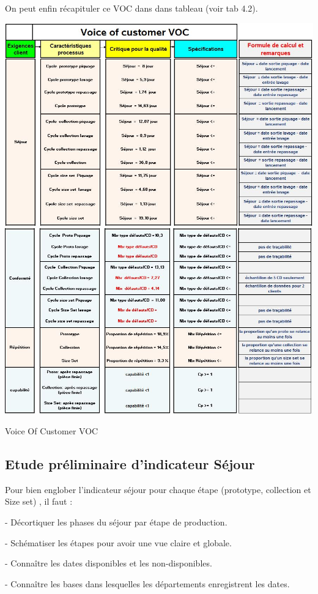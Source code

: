 \documentclass[12pt, a4paper]{thesis}
\begin{document}
On peut enfin récapituler ce VOC dans dans tableau (voir tab 4.2).
\begin{center}
     \includegraphics[scale=0.7]{1.JPG}
 \includegraphics[scale=0.7]{2.JPG}
\end{center}
\begin{table}[!htbp]
\begin{center}
\caption{Voice Of Customer VOC}
 \end{center}
\end{table}

 \subsection{Etude préliminaire d'indicateur Séjour}
Pour bien englober l'indicateur séjour pour chaque étape (prototype, collection et Size set) , il faut :
\item - Décortiquer les phases du séjour par étape de production.
\item - Schématiser les étapes pour avoir une vue claire et globale.
\item - Connaître les dates disponibles et les non-disponibles. 
\item - Connaître les bases dans lesquelles les départements enregistrent les dates.
\end{document}
